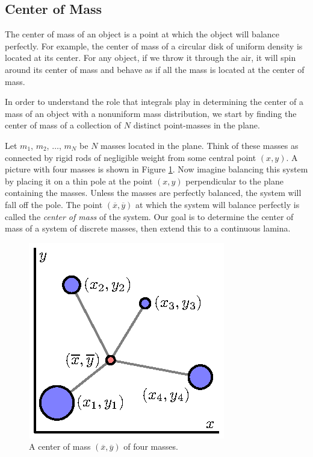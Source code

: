 %

\subsection*{Center of Mass}

The center of mass of an object is a point at which the object will balance perfectly.  For example, the center of mass of a circular disk of uniform density is located at its center.  For any object,  if we throw it through the air, it will spin around its center of mass and behave as if all the mass is located at the center of mass. 

In order to understand the role that integrals play in determining the center of a mass of an object with a nonuniform mass distribution, we start by finding the center of mass of a collection of $N$ distinct point-masses in the plane.  %

Let $m_1$, $m_2$, $\ldots$, $m_N$ be $N$ masses located in the plane. Think of these masses as connected by rigid rods of negligible weight from some central point $(x,y)$. A picture with four masses is shown in Figure \ref{F:11.4.COM}. Now imagine balancing this system by placing it on a thin pole at the point $(x,y)$ perpendicular to the plane containing the masses. Unless the masses are perfectly balanced, the system will fall off the pole. The point $(\overline{x}, \overline{y})$ at which the system will balance perfectly is called the \emph{center of mass} of the system. Our goal is to determine the center of mass of a system of discrete masses, then extend this to a continuous lamina.
\begin{figure}[h]
\begin{center}
  \includegraphics{figures/fig_11_4_masses.eps}
\end{center}
\caption{A center of mass $(\overline{x}, \overline{y})$ of four masses.}
\label{F:11.4.COM}
\end{figure}

